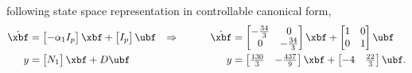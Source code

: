 \documentclass[10pt]{article}
\begin{document}
following state space representation in controllable canonical form, 
\begin{align}
  \dot{\xbf} &=
  \begin{bmatrix}
    -\alpha_1 I_p
  \end{bmatrix}\xbf +
  \begin{bmatrix}
    I_p
  \end{bmatrix}\ubf
  & \Rightarrow \hspace{3em}
  \dot{\xbf} &=
  \begin{bmatrix}
    -\frac{34}{3} & 0 \\ 0 & -\frac{34}{3}
  \end{bmatrix}\xbf
   +
   \begin{bmatrix}
     1 & 0 \\ 0 &1
   \end{bmatrix}\ubf\\
  y &=
  \begin{bmatrix}
    N_1
  \end{bmatrix}\xbf + D\ubf
  & y &=
  \begin{bmatrix}
    \frac{130}{3} & -\frac{437}{9}
  \end{bmatrix}\xbf +
  \begin{bmatrix}
    -4 & \frac{22}{3}
  \end{bmatrix}\ubf.
\end{align}
% 
% 
\end{document}
